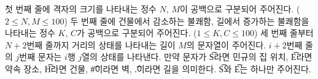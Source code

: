 첫 번째 줄에 격자의 크기를 나타내는 정수 $N$, $M$이 공백으로 구분되어 주어진다. ($2 \leq N, M \leq 100$)
두 번째 줄에 건물에서 감소하는 불쾌함, 길에서 증가하는 불쾌함을 나타내는 정수 $K$, $C$가 공백으로 구분되어 주어진다. ($1 \leq K, C \leq 100$)
세 번째 줄부터 $N+2$번째 줄까지 거리의 상태를 나타내는 길이 $M$의 문자열이 주어진다. $i+2$번째 줄의 $j$번째 문자는 $i$행 $j$열의 상태를 나타낸다. 만약 문자가 \t{S}라면 민규의 집 위치, \t{E}라면 약속 장소, \t{H}라면 건물, \t{#}이라면 벽, \t{.}이라면 길을 의미한다. \t{S}와 \t{E}는 하나만 주어진다.
